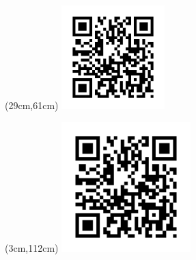 \documentclass[xcolor={table}]{beamer}
\begin{document}
\begin{frame}[fragile=singleslide,t]


\begin{textblock*}{4cm}(29cm,61cm) %
\includegraphics[height=4cm, width=4cm]{QR_code_for_mobile_English_Wikipedia.svg.png}
\end{textblock*}

\begin{textblock*}{5cm}(3cm,112cm) %
\includegraphics[height=5cm, width=5cm]{QR_code_for_mobile_English_Wikipedia.svg.png}
\end{textblock*}

\end{frame}
\end{document}
